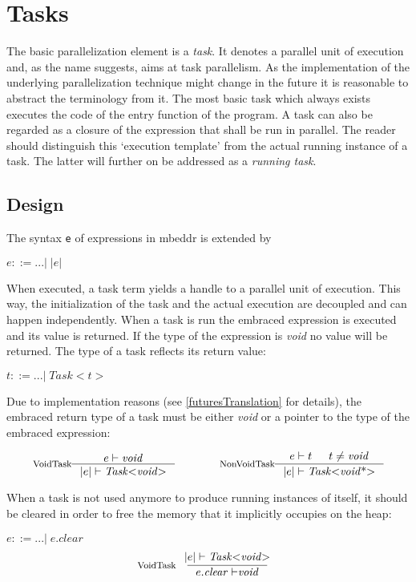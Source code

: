 \section{Tasks}
The basic parallelization element is a \textit{task}. It denotes a parallel unit of execution and, as the name suggests, aims at task parallelism. As the implementation of the underlying parallelization technique might change in the future it is reasonable to abstract the terminology from it. The most basic task which always exists executes the code of the entry function of the program. A task can also be regarded as a closure of the expression that shall be run in parallel. The reader should distinguish this `execution template' from the actual running instance of a task. The latter will further on be addressed as a \textit{running task}.
\subsection{Design}
\label{tasksDesign}
The syntax \texttt{e} of expressions in mbeddr is extended by

$e ::= ...|\;\mathit{|e|}$

When executed, a task term yields a handle to a parallel unit of execution. This way, the initialization of the task and the actual execution are decoupled and can happen independently. When a task is run the embraced expression is executed and its value is returned. If the type of the expression is \textit{void} no value will be returned. The type of a task reflects its return value:

$t ::= ... |\;\mathit{Task{<}t{>}}$

Due to implementation reasons (see \ref{futuresTranslation} for details), the embraced return type of a task must be either \textit{void} or a pointer to the type of the embraced expression:

\begin{align*}
\inference*[VoidTask]{e |- \mathit{void}}{|e| |- \mathit{Task{<}void{>}}} 
\qquad\qquad
\inference*[NonVoidTask]{e |- t & t \neq \mathit{void}}{|e| |- \mathit{Task{<}void{\text{*}}{>}}}
\end{align*}

When a task is not used anymore to produce running instances of itself, it should be cleared in order to free the memory that it implicitly occupies on the heap:

$e ::= ...|\;e.\mathit{clear}$
\begin{align*}
\inference*[VoidTask]{|e| |- \mathit{Task{<}void{>}}}{e.\mathit{clear |-} \mathit{void}} 
\end{align*}

